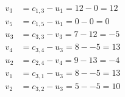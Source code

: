 \[
\begin{aligned}
v_{3} &= c_{1,3} - u_{1} = 12 - 0 = 12 \\
v_{5} &= c_{1,5} - u_{1} = 0 - 0 = 0 \\
u_{3} &= c_{3,3} - v_{3} = 7 - 12 = -5 \\
v_{4} &= c_{3,4} - u_{3} = 8 - -5 = 13 \\
u_{2} &= c_{2,4} - v_{4} = 9 - 13 = -4 \\
v_{1} &= c_{3,1} - u_{3} = 8 - -5 = 13 \\
v_{2} &= c_{3,2} - u_{3} = 5 - -5 = 10 \\
\end{aligned}
\]

